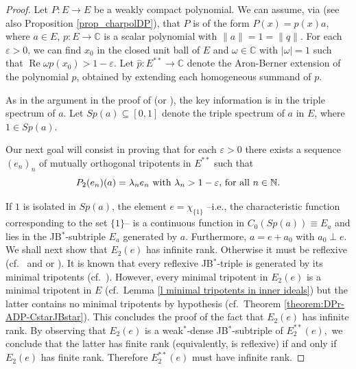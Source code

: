 \documentclass[10pt]{amsart}
\DeclareMathOperator{\re}{Re}
\begin{document}
	\begin{proof} Let $P \colon E \longrightarrow E$ be a  weakly compact polynomial. We can assume, via \cite[Theorem 1.1]{ChoGarMaestreMartin2007} (see also Proposition \ref{prop_charpolDP}), that $P$ is of the form $P(x) = p(x) a$, where $a\in E$, $p\colon E\longrightarrow \mathbb{C}$ is a scalar polynomial with $\|a\| = 1= \|q\|$. For each $\varepsilon>0$, we can find $x_0$ in the closed unit ball of $E$ and $\omega\in \mathbb{C}$ with $|\omega|=1$ such that $\re\omega p(x_0) > 1-\varepsilon.$ Let $\widehat{p} \colon E^{**}\longrightarrow \mathbb{C}$ denote the Aron-Berner extension of the polynomial $p$, obtained by extending each homogeneous summand of $p$.
		
		As in the argument in the proof of \cite[Theorem 3.5]{Santos2014} (or \cite{BeMar2005,MarOikh2004}), the key information is in the triple spectrum of $a$. Let $Sp(a) \subseteq [0,1]$ denote the triple spectrum of $a$ in $E$, where $1\in Sp(a)$.
		
		Our next goal will consist in proving that for each $\varepsilon>0$ there exists a sequence $(e_n)_n$ of mutually orthogonal tripotents in $E^{**}$ such that \begin{equation}\label{eq existence of the sequence of mo tripotents}\hbox{$P_2(e_n) (a) = \lambda_n e_n$ with $\lambda_n >1-\varepsilon,$ for all $n\in \mathbb{N}$.}
		\end{equation}
		
		If $1$ is isolated in $Sp(a)$, the element $e = \chi_{\{1\}}$ --i.e., the characteristic function corresponding to the set $\{1\}$-- is a continuous function in $C_0(Sp(a))\equiv E_a$ and lies in the JB$^*$-subtriple $E_a$ generated by $a$. Furthermore, $a = e + a_0$ with $a_0\perp e$. We shall next show that $E_2(e)$ has infinite rank. Otherwise it must be reflexive (cf.\ \cite[Proposition 4.5]{BuChu92} and \cite[Theorem 6]{ChuIo90} or \cite{BeLoRo03, BeLoPeRo04}). It is known that every reflexive JB$^*$-triple is generated by its minimal tripotents (cf.\ \cite[Proposition 4.5 and Remark 4.6]{BuChu92}). However, every minimal tripotent in $E_{2}(e)$ is a minimal tripotent in $E$ (cf.\ Lemma \ref{l minimal tripotents in inner ideals}) but the latter contains no minimal tripotents by hypothesis (cf.\ Theorem \ref{theorem:DPr-ADP-CstarJBstar}). This concludes the proof of the fact that $E_2(e)$ has infinite rank. By observing that $E_2(e)$ is a weak$^*$-dense JB$^*$-subtriple of $E^{**}_2(e),$ we conclude that the latter has finite rank (equivalently, is reflexive) if and only if  $E_2(e)$ has finite rank. Therefore  $E_2^{**}(e)$ must have infinite rank.
		

\end{proof}
\end{document}

